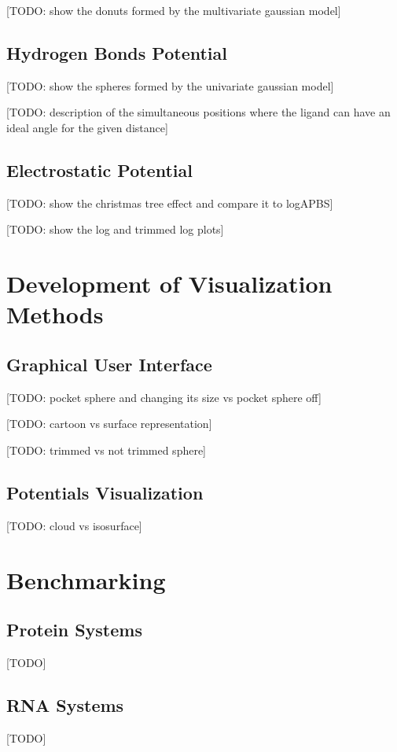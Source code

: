       [TODO: show the donuts formed by the multivariate gaussian model]

  \subsection{Hydrogen Bonds Potential}
    [TODO: show the spheres formed by the univariate gaussian model]

    [TODO: description of the simultaneous positions where the ligand can have an ideal angle for the given distance]

  \subsection{Electrostatic Potential}
    [TODO: show the christmas tree effect and compare it to logAPBS]

    [TODO: show the log and trimmed log plots]


\section{Development of Visualization Methods}
  \subsection{Graphical User Interface}
    [TODO: pocket sphere and changing its size vs pocket sphere off]

    [TODO: cartoon vs surface representation]

    [TODO: trimmed vs not trimmed sphere]

  \subsection{Potentials Visualization}
    [TODO: cloud vs isosurface]


\section{Benchmarking}
  \subsection{Protein Systems}
    [TODO]

  \subsection{RNA Systems}
    [TODO]


